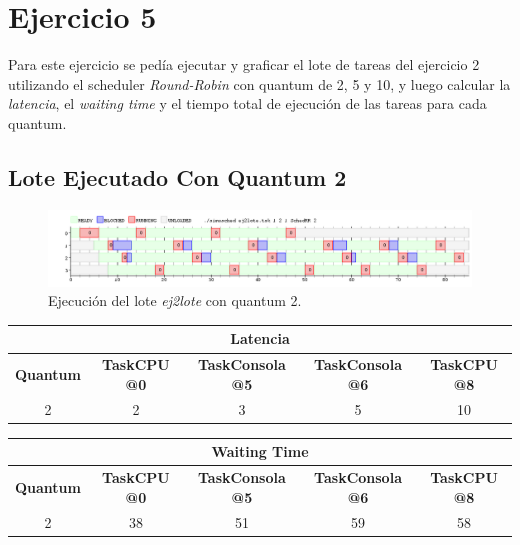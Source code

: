 \section{Ejercicio 5}


Para este ejercicio se pedía ejecutar y graficar el lote de tareas del ejercicio 2 utilizando el scheduler \emph{Round-Robin} con quantum de 2, 5 y 10, y luego calcular la \textit{latencia}, el \textit{waiting time} y el tiempo total de ejecución de las tareas para cada quantum.

\subsection{Lote Ejecutado Con Quantum 2}

\begin{figure}[!h]
	\begin{center}
		\includegraphics[width=500px]{imagenes/ej5_2.png}
		\caption{Ejecución del lote \emph{ej2lote} con quantum 2.}
		\label{fig:grafico_ej5_2}
	\end{center}
\end{figure}

\begin{center}
	\begin{tabular}{|c|c|c|c|c|}
		\hline
		\multicolumn{5}{|c|}{\textbf{Latencia}} \\
		\hline
		\textbf{Quantum} & \textbf{TaskCPU @0} & \textbf{TaskConsola @5} & \textbf{TaskConsola @6} & \textbf{TaskCPU @8} \\
		\hline
		2 & 2 & 3 & 5 & 10 \\
		\hline
	\end{tabular}
\end{center}

\begin{center}
	\begin{tabular}{|c|c|c|c|c|}
		\hline
		\multicolumn{5}{|c|}{\textbf{Waiting Time}} \\
		\hline
		\textbf{Quantum} & \textbf{TaskCPU @0} & \textbf{TaskConsola @5} & \textbf{TaskConsola @6} & \textbf{TaskCPU @8} \\
		\hline
		2 & 38 & 51 & 59 & 58 \\
		\hline
	\end{tabular}
\end{center}


